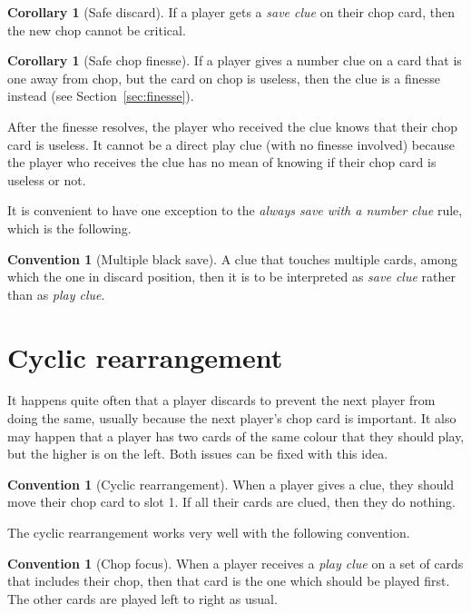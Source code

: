\documentclass[a4paper]{article}
\theoremstyle{plain}
\theoremstyle{definition}
\newtheorem{corollary}[theorem]{Corollary}
\newtheorem{convention}[theorem]{Convention}
\begin{document}
\begin{corollary}[Safe discard]
	If a player gets a \emph{save clue} on their chop card, then the new chop cannot be critical.
\end{corollary}

\begin{corollary}[Safe chop finesse]
	If a player gives a number clue on a card that is one away from chop, but the card on chop is useless, then the clue is a finesse instead (see Section~\ref{sec:finesse}).
\end{corollary}

After the finesse resolves, the player who received the clue knows that their chop card is useless. It cannot be a direct play clue (with no finesse involved) because the player who receives the clue has no mean of knowing if their chop card is useless or not.

It is convenient to have one exception to the \emph{always save with a number clue} rule, which is the following.

\begin{convention}[Multiple black save]
	A  clue that touches multiple cards, among which the one in discard position, then it is to be interpreted as \emph{save clue} rather than as \emph{play clue}.
\end{convention}

\section{Cyclic rearrangement}

It happens quite often that a player discards to prevent the next player from doing the same, usually because the next player's chop card is important. It also may happen that a player has two cards of the same colour that they should play, but the higher is on the left. Both issues can be fixed with this idea.

\begin{convention}[Cyclic rearrangement]
	\label{cyclic-rearrangement}
	When a player gives a clue, they should move their chop card to slot 1. If all their cards are clued, then they do nothing.
\end{convention}

The cyclic rearrangement works very well with the following convention.

\begin{convention}[Chop focus]
	\label{chop-focus}
	When a player receives a \emph{play clue} on a set of cards that includes their chop, then that card is the one which should be played first. The other cards are played left to right as usual.
\end{convention}
\end{document}
